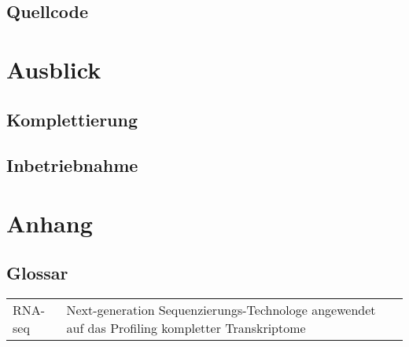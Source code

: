 \documentclass[a4paper]{thesis}
\begin{document}
\subsection{Quellcode}

\section{Ausblick}

\subsection{Komplettierung}

\subsection{Inbetriebnahme}

\section{Anhang}

\subsection{Glossar}

\begin{tabularx}{\textwidth}{lX}
	  RNA-seq
	& Next-generation Sequenzierungs-Technologe angewendet auf
          das Profiling kompletter Transkriptome
\\
\end{tabularx}
\end{document}
